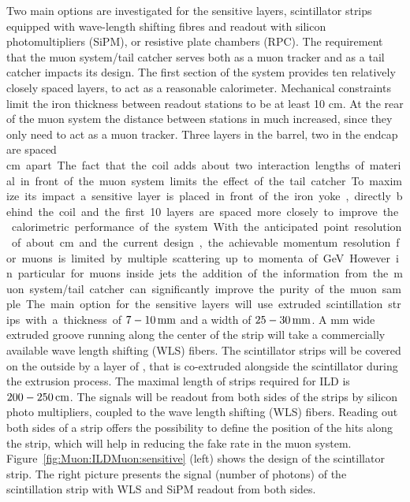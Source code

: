 Two main options are investigated for the sensitive layers, scintillator strips equipped with wave-length shifting fibres and readout with silicon photomultipliers (SiPM), or resistive plate chambers (RPC).
The requirement that the muon system/tail catcher serves both as a muon tracker and as a tail catcher impacts its design. The first section of the system provides ten relatively closely spaced layers, to act as a reasonable calorimeter. Mechanical constraints limit the iron thickness between readout stations to be at least 10 cm. At the rear of the muon system the distance between stations in much increased, since they only need to act as a muon tracker. Three layers in the barrel, two in the endcap are spaced \unit[60] cm apart. The fact that the coil adds about two interaction lengths of material in front of the muon system limits the effect of the tail catcher. To maximize its impact a sensitive layer is placed in front of the iron yoke, directly behind the coil and the first 10 layers are spaced more closely to improve the calorimetric performance of the system.
With the anticipated point resolution of about \unit[1]{cm} and the current design, the
achievable momentum resolution for muons is limited by multiple scattering up to
momenta of \unit[5]{GeV}. However in particular for muons inside jets the addition of the
information from the muon system/tail catcher can significantly improve the purity of the muon sample.
The main option for the sensitive layers will use extruded scintillation strips with a thickness of $7-\unit[10]{mm}$ and a width of $25-\unit[30]{mm}$. A \unit[1]{mm} wide extruded groove running along the center of the strip will take a commercially available wave length shifting (WLS) fibers. The scintillator strips will be covered on the outside by a layer of , that is co-extruded alongside the scintillator during the extrusion process. The maximal length of strips required for ILD is $200-\unit[250]{cm}$. The signals will be readout from both sides of the strips by silicon photo multipliers, coupled to the wave length shifting (WLS) fibers. Reading out both sides of a strip offers the possibility to define the position of the hits along the strip, which will help in reducing the fake rate in the muon system. Figure~\ref{fig:Muon:ILDMuon:sensitive} (left) shows the design of the scintillator strip. The right picture presents the signal (number of photons) of the scintillation strip with WLS and SiPM readout from both sides.

